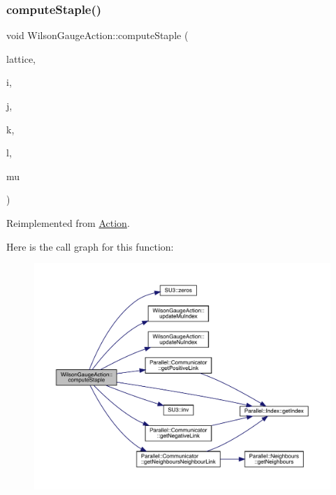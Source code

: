 \subsubsection{\texorpdfstring{computeStaple()}{computeStaple()}}
{\footnotesize\ttfamily void Wilson\+Gauge\+Action\+::compute\+Staple (\begin{DoxyParamCaption}\item[{\mbox{\hyperlink{class_lattice}{Lattice}}$<$ \mbox{\hyperlink{class_s_u3}{S\+U3}} $>$ $\ast$}]{lattice,  }\item[{unsigned int}]{i,  }\item[{unsigned int}]{j,  }\item[{unsigned int}]{k,  }\item[{unsigned int}]{l,  }\item[{int}]{mu }\end{DoxyParamCaption})\hspace{0.3cm}{\ttfamily [virtual]}}



Reimplemented from \mbox{\hyperlink{class_action_a2d5a64b47a8913955e5911ca072ff80d}{Action}}.

Here is the call graph for this function\+:\nopagebreak
\begin{figure}[H]
\begin{center}
\leavevmode
\includegraphics[width=350pt]{class_wilson_gauge_action_af1f6ba42fcc2b923dc3b37bf150bfae9_cgraph}
\end{center}
\end{figure}
\mbox{\label{class_wilson_gauge_action_a43cf939cd53495b7225fbeaa8a0ff6e8}} 
